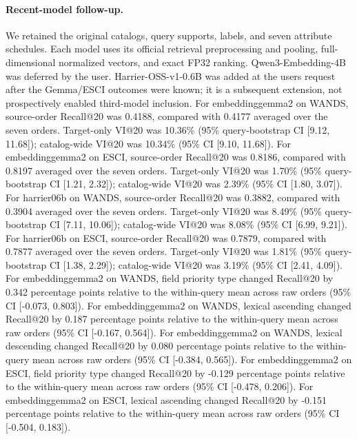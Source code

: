 \paragraph{Recent-model follow-up.} We retained the original catalogs, query supports, labels, and seven attribute schedules. Each model uses its official retrieval preprocessing and pooling, full-dimensional normalized vectors, and exact FP32 ranking. Qwen3-Embedding-4B was deferred by the user. Harrier-OSS-v1-0.6B was added at the user\textquotesingle s request after the Gemma/ESCI outcomes were known; it is a subsequent extension, not prospectively enabled third-model inclusion.
For embeddinggemma2 on WANDS, source-order Recall@20 was 0.4188, compared with 0.4177 averaged over the seven orders. Target-only VI@20 was 10.36\% (95\% query-bootstrap CI [9.12, 11.68]); catalog-wide VI@20 was 10.34\% (95\% CI [9.10, 11.68]).
For embeddinggemma2 on ESCI, source-order Recall@20 was 0.8186, compared with 0.8197 averaged over the seven orders. Target-only VI@20 was 1.70\% (95\% query-bootstrap CI [1.21, 2.32]); catalog-wide VI@20 was 2.39\% (95\% CI [1.80, 3.07]).
For harrier06b on WANDS, source-order Recall@20 was 0.3882, compared with 0.3904 averaged over the seven orders. Target-only VI@20 was 8.49\% (95\% query-bootstrap CI [7.11, 10.06]); catalog-wide VI@20 was 8.08\% (95\% CI [6.99, 9.21]).
For harrier06b on ESCI, source-order Recall@20 was 0.7879, compared with 0.7877 averaged over the seven orders. Target-only VI@20 was 1.81\% (95\% query-bootstrap CI [1.38, 2.29]); catalog-wide VI@20 was 3.19\% (95\% CI [2.41, 4.09]).
For embeddinggemma2 on WANDS, field priority type changed Recall@20 by 0.342 percentage points relative to the within-query mean across raw orders (95\% CI [-0.073, 0.803]).
For embeddinggemma2 on WANDS, lexical ascending changed Recall@20 by 0.187 percentage points relative to the within-query mean across raw orders (95\% CI [-0.167, 0.564]).
For embeddinggemma2 on WANDS, lexical descending changed Recall@20 by 0.080 percentage points relative to the within-query mean across raw orders (95\% CI [-0.384, 0.565]).
For embeddinggemma2 on ESCI, field priority type changed Recall@20 by -0.129 percentage points relative to the within-query mean across raw orders (95\% CI [-0.478, 0.206]).
For embeddinggemma2 on ESCI, lexical ascending changed Recall@20 by -0.151 percentage points relative to the within-query mean across raw orders (95\% CI [-0.504, 0.183]).
